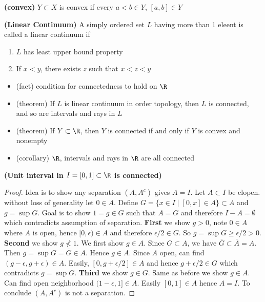 \documentclass[10.5pt]{article}
\begin{document}
\begin{defn*}
    \textbf{(convex)} $Y\subset X$ is convex if every $a<b\in Y$, $[a,b] \in Y$
\end{defn*}

\begin{defn*}
    \textbf{(Linear Continuum)} A simply ordered set $L$ having more than 1 eleent is called a linear continuum if 
    \begin{enumerate}
        \item $L$ has least upper bound property
        \item If $x<y$, there exists $z$ such that $x<z<y$
    \end{enumerate}
    \begin{itemize}
        \item (fact) condition for connectedness to hold on $\R$
        \item (theorem) If $L$ is linear continuum in order topology, then $L$ is connected, and so are intervals and rays in $L$
        \item (theorem) If $Y\subset \R$, then $Y$ is connected if and only if $Y$ is convex and nonempty
        \item (corollary) $\R$, intervals and rays in $\R$ are all connected
    \end{itemize}
\end{defn*}

\begin{theorem*}
    \textbf{(Unit interval in $I=[0,1] \subset \R$ is connected)}
    \begin{proof}
        Idea is to show any separation $(A,A^c)$ gives $A = I$. Let $A \subset I$ be clopen. without loss of generality let $0\in A$. Define $G = \{x\in I \mid [0,x] \in A \}\subset A$ and $g = \sup G$. Goal is to show $1 = g \in G$ such that $A = G$ and therefore $I - A = \emptyset$ which contradicts assumption of separation. \textbf{First} we show $g>0$, note $0\in A$ where $A$ is open, hence $[0,\epsilon)\in A$ and therefore $\epsilon/2 \in G$. So $g=\sup G \geq \epsilon/2 > 0$. \textbf{Second} we show $g \not< 1$. We first show $g\in A$. Since $G\subset A$, we have $\overline{G} \subset \overline{A}=A$. Then $g = \sup G = \overline{G} \in A$. Hence $g\in A$. Since $A$ open, can find $(g-\epsilon, g+\epsilon)\in A$. Easily, $[0, g + \epsilon/2] \in A$ and hence $g+\epsilon/2 \in G$ which contradicts $g =\sup G$. \textbf{Third} we show $g\in G$. Same as before we show $g\in A$. Can find open neighborhood $(1-\epsilon, 1] \in A$. Easily $[0,1] \in A$ hence $A=I$. To conclude $(A,A^c)$ is not a separation. 
    \end{proof}
\end{theorem*}
\end{document}
